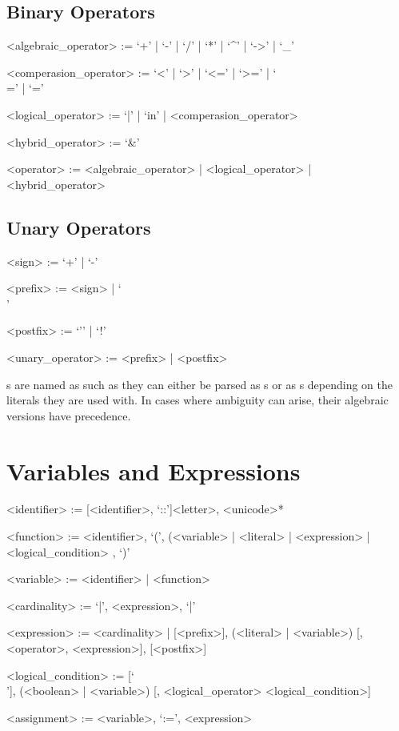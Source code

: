 \documentclass[11pt,a4paper]{book}
\begin{document}
\subsection{Binary Operators}

\begin{grammar}

<algebraic\_operator> := `+' | `-' | `/' | `*' | `^' | `->' | `_' 

<comperasion\_operator> := `<' | `>' | `<=' | `>=' | `\\=' | `='

<logical\_operator> := `|' | `in' | <comperasion\_operator>

<hybrid\_operator> := `&'

<operator> := <algebraic\_operator> | <logical\_operator> | <hybrid\_operator>

\end{grammar}

\subsection{Unary Operators}

\begin{grammar}
<sign> := `+' | `-'

<prefix> := <sign> | `\\'

<postfix> := `'' | `!'

<unary\_operator> := <prefix> | <postfix>
\end{grammar}


s are named as such as they can either be parsed as s or as s depending on the literals they are used with. In cases where ambiguity can arise, their algebraic versions have precedence.

\section{Variables and Expressions}

\begin{grammar}
<identifier> := [<identifier>, `::']<letter>, <unicode>*

<function> := <identifier>, `(', (<variable> | <literal> | <expression> | <logical\_condition> , `)'

<variable> := <identifier> | <function>

<cardinality> := `|', <expression>, `|'

<expression> := <cardinality> | [<prefix>], (<literal> | <variable>) [, <operator>, <expression>], [<postfix>]

<logical\_condition> := [`\\'], (<boolean> | <variable>) [, <logical\_operator> <logical\_condition>]

<assignment> := <variable>, `:=', <expression>
\end{grammar}
\end{document}
